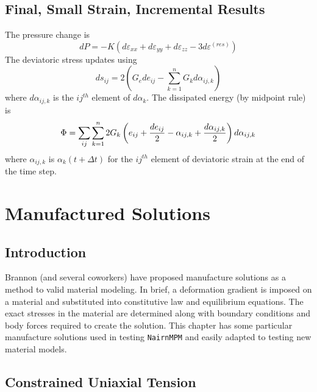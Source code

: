 \documentclass[11pt]{book}
\def\e#1{\varepsilon_{#1}}
\def\er#1{\varepsilon_{#1}^{(res)}}
\begin{document}
\section{Final, Small Strain, Incremental Results}

The pressure change is
\begin{equation}
     dP = -K(d\e{xx} + d\e{yy} + d\e{zz} - 3d\er{})
\end{equation}
The deviatoric stress updates using
\begin{equation}
     ds_{ij} = 2\left( G_e de_{ij} -   \sum_{k=1}^n G_k d\alpha_{ij,k} \right)
\end{equation}
where $d\alpha_{ij,k}$ is the $ij^{th}$ element of $d\alpha_k$.
The dissipated energy (by midpoint rule) is
\begin{equation}
     \Phi = \sum_{ij} \sum_{k=1}^n 2G_k\left(e_{ij}+{de_{ij}\over 2}-\alpha_{ij,k}+{d\alpha_{ij,k}\over 2}\right) d\alpha_{ij,k}
\end{equation}
where $\alpha_{ij,k}$ is $\alpha_k(t+\Delta t)$ for the $ij^{th}$ element of deviatoric strain at the end of the time step.



\chapter{Manufactured Solutions}

\section{Introduction}

Brannon (and several coworkers) have proposed manufacture solutions as a method to valid material modeling. In brief, a deformation gradient is imposed on a material and substituted into constitutive law and equilibrium equations. The exact stresses in the material are determined along with boundary conditions and body forces required to create the solution. This chapter has some particular manufacture solutions used in testing {\tt NairnMPM} and easily adapted to testing new material models.

\section{Constrained Uniaxial Tension}
\end{document}
